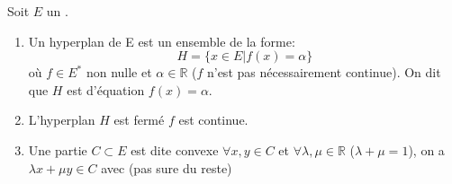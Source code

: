 \documentclass[12pt,a4paper]{article}
\begin{document}
\begin{flushleft}
\begin{mydef}
Soit $E$ un \evn . 
\begin{enumerate}
\item Un hyperplan de E est un ensemble de la forme: $$ H = \{ x \in E | f(x) = \alpha \}$$ où $f \in E^*$ non nulle et $\alpha \in \mathbb{R}$ ($f$ n'est pas nécessairement continue). On dit que $H$ est d'équation $f(x) = \alpha$.
\item L'hyperplan $H$ est fermé \ssi $f$ est continue.
\item Une partie $C \subset E$ est dite convexe \ssi $\forall x, y \in C$ et $\forall \lambda , \mu \in \mathbb{R}$ ($\lambda + \mu = 1$), on a $\lambda x + \mu y \in C$ avec (pas sure du reste)
\end{enumerate}
\end{mydef}












































\end{flushleft}
\end{document}
